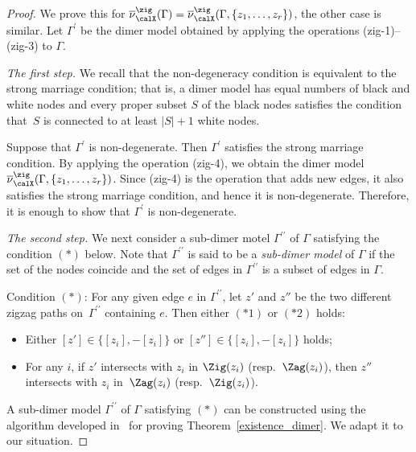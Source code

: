 \begin{proof}
We prove this for $\overline{\nu}^\zig_\calX(\Gamma)=\overline{\nu}^\zig_\calX(\Gamma, \{z_1,\dots,z_r\})$, the other case is similar.
Let $\Gamma^\prime$ be the dimer model obtained by applying the operations (zig-1)--(zig-3) to $\Gamma$.

{\it The first step.}
We recall that the non-degeneracy condition is equivalent to the strong marriage condition; that is, a dimer model has equal numbers of black and white nodes and every proper subset $S$ of the black nodes satisfies the condition that~$S$ is connected to at least $|S|+1$ white nodes.

Suppose that $\Gamma^\prime$ is non-degenerate. Then $\Gamma^\prime$ satisfies the strong marriage condition.
By applying the operation (zig-4), we obtain the dimer model $\overline{\nu}^\zig_\calX(\Gamma, \{z_1,\dots,z_r\})$.
Since (zig-4) is the operation that adds new edges, it also satisfies the strong marriage condition, and hence it is non-degenerate.
Therefore, it is enough to show that $\Gamma^\prime$ is non-degenerate.

{\it The second step.}
We next consider a sub-dimer motel $\Gamma^{\prime \prime}$ of $\Gamma$ satisfying the condition $(*)$ below.
Note that $\Gamma^{\prime\prime}$ is said to be a \emph{sub-dimer model} of $\Gamma$
if the set of the nodes coincide and the set of edges in $\Gamma^{\prime\prime}$ is a subset of edges in $\Gamma$.

Condition $(*)$: For any given edge $e$ in $\Gamma^{\prime\prime}$,
let $z'$ and $z''$ be the two different zigzag paths on~$\Gamma^{\prime\prime}$ containing $e$.
Then either $(*1)$ or $(*2)$ holds:
\begin{itemize}
\setlength{\parskip}{0pt}
\itemsep=0pt
\setlength{\leftskip}{0.3cm}
\item[$(*1)$] Either $[z'] \in \{[z_i],-[z_i]\}$ or $[z''] \in \{[z_i],-[z_i]\}$ holds;
\item[$(*2)$] For any $i$, if $z'$ intersects with $z_i$ in $\Zig(z_i)$ (resp.~$\Zag(z_i)$), then $z''$ intersects with $z_i$ in~$\Zag(z_i)$ (resp.~$\Zig(z_i)$).
\end{itemize}

A sub-dimer model $\Gamma^{\prime \prime}$ of $\Gamma$ satisfying $(*)$ can be constructed using
the algorithm developed in~\cite{Gul,IU2} for proving Theorem~\ref{existence_dimer}.
We adapt it to our situation.


\end{proof}

